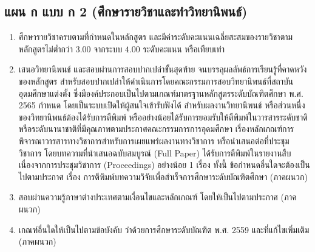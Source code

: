 \subsection{แผน ก แบบ ก 2 (ศึกษารายวิชาและทำวิทยานิพนธ์)}
\begin{enumerate}
   	\item ศึกษารายวิชาครบตามที่กำหนดในหลักสูตร และมีค่าระดับคะแนนเฉลี่ยสะสมของรายวิชาตามหลักสูตรไม่ต่ำกว่า $3.00$ จากระบบ $4.00$ ระดับคะแนน หรือเทียบเท่า 
   	\item เสนอวิทยานิพนธ์ และสอบผ่านการสอบปากเปล่าขั้นสุดท้าย จนบรรลุผลลัพธ์การเรียนรู้ที่คาดหวังของหลักสูตร สำหรับสอบปากเปล่าให้ดำเนินการโดยคณะกรรมการสอบวิทยานิพนธ์ที่สถาบันอุดมศึกษาแต่งตั้ง ซึ่งมีองค์ประกอบเป็นไปตามเกณฑ์มาตรฐานหลักสูตรระดับบัณฑิตศึกษา พ.ศ. 2565 กำหนด โดยเป็นระบบเปิดให้ผู้สนใจเข้ารับฟังได้ สำหรับผลงานวิทยานิพนธ์ หรือส่วนหนึ่งของวิทยานิพนธ์ต้องได้รับการตีพิมพ์ หรืออย่างน้อยได้รับการยอมรับให้ตีพิมพ์ในวารสารระดับชาติหรือระดับนานาชาติที่มีคุณภาพตามประกาศคณะกรรมการการอุดมศึกษา เรื่องหลักเกณฑ์การพิจารณาวารสารทางวิชาการสำหรับการเผยแพร่ผลงานทางวิชาการ 
   		   หรือนำเสนอต่อที่ประชุมวิชาการ โดยบทความที่นำเสนอฉบับสมบูรณ์ (Full Paper) ได้รับการตีพิมพ์ในรายงานสืบเนื่องจากการประชุมวิชาการ (Proceedings) อย่างน้อย 1 เรื่อง ทั้งนี้ ข้อกำหนดอื่นใดจะต้องเป็นไปตามประกาศ \university{} เรื่อง การตีพิมพ์บทความวิจัยเพื่อสำเร็จการศึกษาระดับบัณฑิตศึกษา (ภาคผนวก)  	
   \item สอบผ่านความรู้ภาษาต่างประเทศตามเงื่อนไขและหลักเกณฑ์ โดยให้เป็นไปตามประกาศ\university{} (ภาคผนวก)
   	\item เกณฑ์อื่นใดให้เป็นไปตามข้อบังคับ\university{} ว่าด้วยการศึกษาระดับบัณฑิต พ.ศ. 2559 และที่แก้ไขเพิ่มเติม (ภาคผนวก)   
   	 \end{enumerate}
   	 
